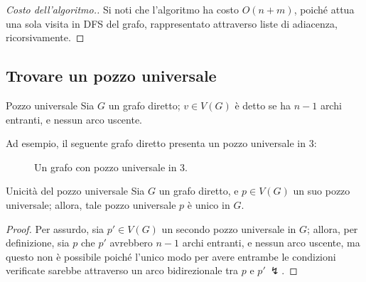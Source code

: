 \documentclass[a4paper, 12pt]{report}
\begin{document}
    \begin{proof}[Costo dell'algoritmo.]
        Si noti che l'algoritmo ha costo $O(n + m)$, poiché attua una sola visita in DFS del grafo, rappresentato attraverso liste di adiacenza, ricorsivamente.
    \end{proof}

    \subsection{Trovare un pozzo universale}

    \begin{frameddefn}{Pozzo universale}
        Sia $G$ un grafo diretto; $v \in V(G)$ è detto  se ha $n - 1$ archi entranti, e nessun arco uscente.
    \end{frameddefn}

    \begin{example}
        Ad esempio, il seguente grafo diretto presenta un pozzo universale in $3$:

        \begin{figure}[H]
            \centering
            \caption{Un grafo con pozzo universale in $3$.}
        \end{figure}
    \end{example}

    \begin{framedthm}{Unicità del pozzo universale}
        Sia $G$ un grafo diretto, e $p \in V(G)$ un suo pozzo universale; allora, tale pozzo universale $p$ è unico in $G$.
    \end{framedthm}

    \begin{proof}
        Per assurdo, sia $p' \in V(G)$ un secondo pozzo universale in $G$; allora, per definizione, sia $p$ che $p'$ avrebbero $n - 1$ archi entranti, e nessun arco uscente, ma questo non è possibile poiché l'unico modo per avere entrambe le condizioni verificate sarebbe attraverso un arco bidirezionale tra $p$ e $p' \ \lightning$.
    \end{proof}
\end{document}
